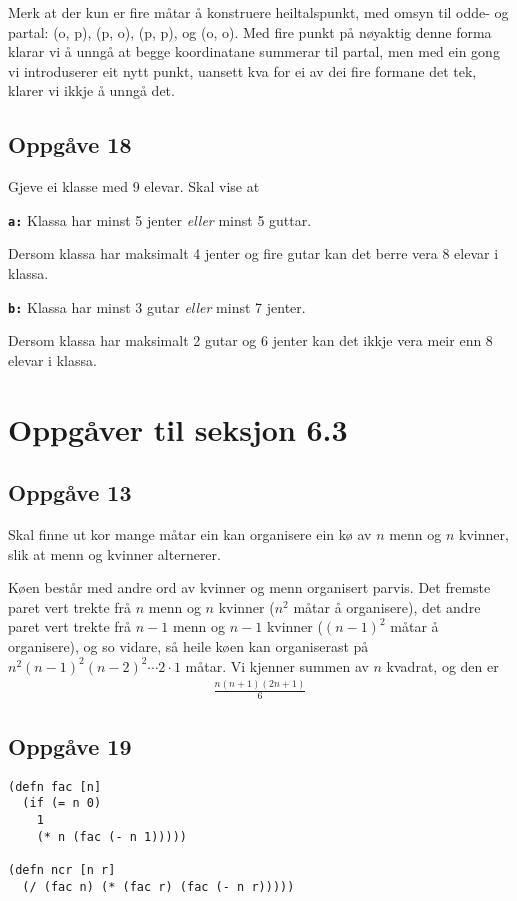 \documentclass[a4paper, 11pt]{article}
\newcommand{\deloppg}[1]{\vspace{1mm}\noindent \textbf{\tt \themecolor{#1:}}}
\newcommand{\themeshade}{Mahogany}
\newcommand{\themecolor}[1]{\textcolor{\themeshade}{#1}}
\begin{document}
Merk at der kun er fire måtar å konstruere heiltalspunkt, med omsyn til odde- og partal:
(o, p), (p, o), (p, p), og (o, o).
Med fire punkt på nøyaktig denne forma klarar vi å unngå at begge koordinatane summerar
til partal, men med ein gong vi introduserer eit nytt punkt, uansett kva for ei av dei
fire formane det tek, klarer vi ikkje å unngå det.


\newpage
\subsection*{Oppgåve 18}
Gjeve ei klasse med 9 elevar. Skal vise at

\deloppg{a} Klassa har minst 5 jenter {\em eller} minst 5 guttar.

Dersom klassa har maksimalt 4 jenter og fire gutar kan det berre vera 8 elevar i klassa.

\deloppg{b} Klassa har minst 3 gutar {\em eller} minst 7 jenter.

Dersom klassa har maksimalt 2 gutar og 6 jenter kan det ikkje vera meir enn 8 elevar i klassa.


\section*{Oppgåver til seksjon 6.3}
\subsection*{Oppgåve 13}
Skal finne ut kor mange måtar ein kan organisere ein kø av \(n\) menn og \(n\) kvinner, slik at
menn og kvinner alternerer.

Køen består med andre ord av kvinner og menn organisert parvis. Det fremste paret vert trekte frå
\(n\) menn og \(n\) kvinner (\(n^2\) måtar å organisere), det andre paret vert trekte frå \(n-1\)
menn og \(n-1\) kvinner (\((n-1)^2\) måtar å organisere), og so vidare, så heile køen kan organiserast på
\(n^2(n-1)^2(n-2)^2 \cdots 2 \cdot 1\) måtar. Vi kjenner summen av \(n\) kvadrat, og den er
\begin{align*}
    \frac{n(n+1)(2n+1)}{6}
\end{align*}


\subsection*{Oppgåve 19}
\begin{lstlisting}
(defn fac [n]
  (if (= n 0)
    1
    (* n (fac (- n 1)))))

(defn ncr [n r]
  (/ (fac n) (* (fac r) (fac (- n r)))))
\end{lstlisting}
\end{document}
